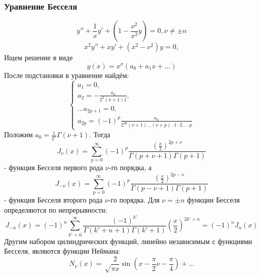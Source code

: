 \documentclass[11pt]{article}
\begin{document}
\subsubsection{Уравнение Бесселя}
\label{sec:orgdcf3442}
\begin{equation}
y'' + \frac1xy' + \left(1 - \frac{\nu^2}{x^2}y\right) = 0, \nu \neq \pm n
\end{equation}
\begin{equation}
x^2y'' + xy' + (x^2 - \nu^2)y = 0,
\end{equation}
Ищем решение в виде
\begin{equation}
y(x) = x^{\sigma}(a_0 + a_1x + \ldots)
\end{equation}
После подстановки в уравнение найдём:
\begin{equation}
\begin{cases}
a_1 = 0, \\
a_2 = -\frac{a_0}{2^2(\nu + 1)1}, \\
\ldots
a_{2p + 1} = 0, \\
a_{2p} = (-1)^p\frac{a_0}{2^{2p}(\nu + 1)\ldots(\nu + p)\cdot1\cdot2\ldots\cdot p}
\end{cases}
\end{equation}
Положим $a_0 = \frac1{2^{\nu}}\Gamma(\nu + 1)$. Тогда
\begin{equation}
J_{\nu}(x) = \sum_{p = 0}^{\infty}(-1)^p\frac{\left(\frac{x}2\right)^{2p + \nu}}{\Gamma(p + \nu + 1)\Gamma(p + 1)}
\end{equation}
- функция Бесселя первого рода $\nu$-го порядка, а
\begin{equation}
J_{-\nu}(x) = \sum_{p = 0}^{\infty}(-1)^p\frac{\left(\frac{x}2\right)^{2p-\nu}}{\Gamma(p - \nu + 1)\Gamma(p + 1)}
\end{equation}
- функция Бесселя второго рода $\nu$-го порядка. Для $\nu = \pm n$ функции Бесселя определяются по непрерывности:
\begin{equation}
J_{-n}(x) = (-1)^n\sum_{k' = 0}^{\infty}\frac{(-1)^{k'}}{\Gamma(k' + n + 1)\Gamma(k' + 1)}\left(\frac{x}2\right)^{2k' + n} = (-1)^nJ_n(x)
\end{equation}
Другим набором цилиндрических функций, линейно независимым с функциями Бесселя, являются функции Неймана:
\begin{equation}
N_{\nu}(x) = \sqrt\frac2{\pi x}\sin\left(x - \frac{\pi}2\nu - \frac{\pi}4\right) + \ldots
\end{equation}
\end{document}

